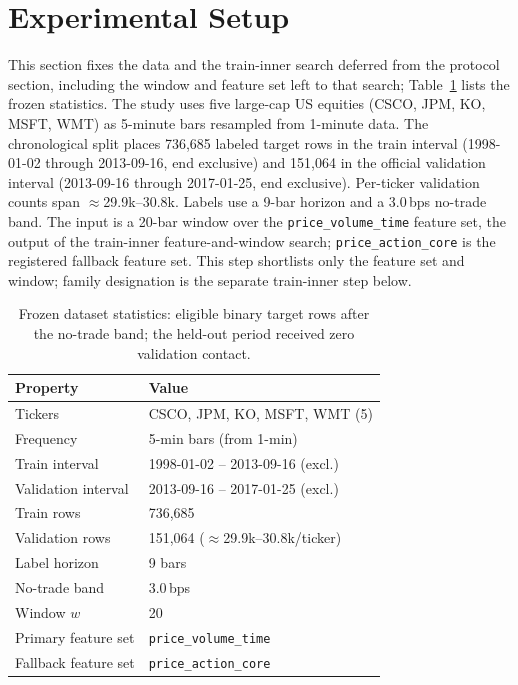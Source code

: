 \section{Experimental Setup}
\label{sec:setup}

This section fixes the data and the train-inner search deferred from the protocol
section, including the window and feature set left to that search;
Table~\ref{tab:dataset} lists the frozen statistics. The study uses
five large-cap US equities (CSCO, JPM, KO, MSFT, WMT) as 5-minute bars resampled
from 1-minute data. The chronological split places 736{,}685 labeled target rows
in the train interval (1998-01-02 through 2013-09-16, end exclusive) and 151{,}064
in the official validation interval (2013-09-16 through 2017-01-25, end exclusive).
Per-ticker validation counts span $\approx$29.9k--30.8k. Labels use a
9-bar horizon and a 3.0\,bps no-trade band. The input is a 20-bar window over the
\texttt{price\_volume\_time} feature set, the output of the train-inner
feature-and-window search; \texttt{price\_action\_core} is the registered
fallback feature set. This step shortlists only the feature set and window;
family designation is the separate train-inner step below.

\begin{table}[t]
  \caption{Frozen dataset statistics: eligible binary target rows after the
    no-trade band; the held-out period received zero validation contact.}
  \label{tab:dataset}
  \begin{tabular}{ll}
    \toprule
    Property & Value \\
    \midrule
    Tickers & CSCO, JPM, KO, MSFT, WMT (5) \\
    Frequency & 5-min bars (from 1-min) \\
    Train interval & 1998-01-02 -- 2013-09-16 (excl.) \\
    Validation interval & 2013-09-16 -- 2017-01-25 (excl.) \\
    Train rows & 736{,}685 \\
    Validation rows & 151{,}064 ($\approx$29.9k--30.8k/ticker) \\
    Label horizon & 9 bars \\
    No-trade band & 3.0\,bps \\
    Window $w$ & 20 \\
    Primary feature set & \texttt{price\_volume\_time} \\
    Fallback feature set & \texttt{price\_action\_core} \\
    \bottomrule
  \end{tabular}
\end{table}

